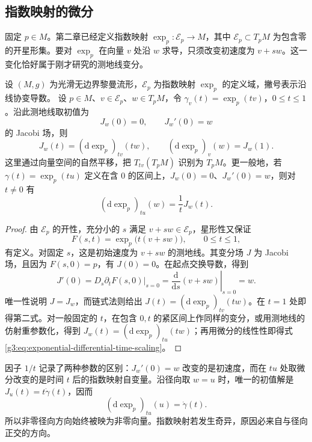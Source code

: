 \subsection{指数映射的微分}
\label{g3:subsec:0602:03}

固定 \(p\in M\)。第二章已经定义指数映射 \(\exp_p:\mathcal E_p\to M\)，其中 \(\mathcal E_p\subset T_pM\) 为包含零的开星形集。要对 \(\exp_p\) 在向量 \(v\) 处沿 \(w\) 求导，只须改变初速度为 \(v+sw\)。这一变化恰好属于刚才研究的测地线变分。

\begin{proposition}\label{g3:prop:exponential-differential-jacobi}
	设 \((M,g)\) 为光滑无边界黎曼流形，\(\mathcal E_p\) 为指数映射 \(\exp_p\) 的定义域，撇号表示沿线协变导数。
	设 \(p\in M\)、\(v\in\mathcal E_p\)、\(w\in T_pM\)，令 \(\gamma_v(t)=\exp_p(tv)\)，\(0\le t\le1\)。沿此测地线取初值为
	\[
		J_w(0)=0,\qquad J_w'(0)=w
	\]
	的 Jacobi 场，则
	\begin{equation}\label{g3:eq:exponential-differential-jacobi}
		J_w(t)=(\mathrm d\exp_p)_{tv}(tw),
		\qquad (\mathrm d\exp_p)_v(w)=J_w(1).
	\end{equation}
	这里通过向量空间的自然平移，把 \(T_{tv}(T_pM)\) 识别为 \(T_pM\)。更一般地，若 \(\gamma(t)=\exp_p(tu)\) 定义在含 \(0\) 的区间上，\(J_w(0)=0\)、\(J_w'(0)=w\)，则对 \(t\ne0\) 有
	\begin{equation}\label{g3:eq:exponential-differential-time-scaling}
		(\mathrm d\exp_p)_{tu}(w)=\frac1tJ_w(t).
	\end{equation}
\end{proposition}
\begin{proof}
	由 \(\mathcal E_p\) 的开性，充分小的 \(s\) 满足 \(v+sw\in\mathcal E_p\)，星形性又保证
	\[
		F(s,t)=\exp_p\bigl(t(v+sw)\bigr),\qquad 0\le t\le1,
	\]
	有定义。对固定 \(s\)，这是初始速度为 \(v+sw\) 的测地线。其变分场 \(J\) 为 Jacobi 场，且因为 \(F(s,0)=p\)，有 \(J(0)=0\)。在起点交换导数，得到
	\[
		J'(0)=D_s\partial_tF(s,0)\big|_{s=0}
		=\left.\frac{\mathrm d}{\mathrm ds}(v+sw)\right|_{s=0}=w.
	\]
	唯一性说明 \(J=J_w\)，而链式法则给出 \(J(t)=(\mathrm d\exp_p)_{tv}(tw)\)。在 \(t=1\) 处即得第二式。对一般固定的 \(t\)，在包含 \(0,t\) 的紧区间上作同样的变分，或用测地线的仿射重参数化，得到 \(J_w(t)=(\mathrm d\exp_p)_{tu}(tw)\)；再用微分的线性性即得式\eqref{g3:eq:exponential-differential-time-scaling}。
\end{proof}

因子 \(1/t\) 记录了两种参数的区别：\(J_w'(0)=w\) 改变的是初速度，而在 \(tu\) 处取微分改变的是时间 \(t\) 后的指数映射自变量。沿径向取 \(w=u\) 时，唯一的初值解是 \(J_u(t)=t\dot\gamma(t)\)，因而
\[
	(\mathrm d\exp_p)_{tu}(u)=\dot\gamma(t).
\]
所以非零径向方向始终被映为非零向量。指数映射若发生奇异，原因必来自与径向正交的方向。

